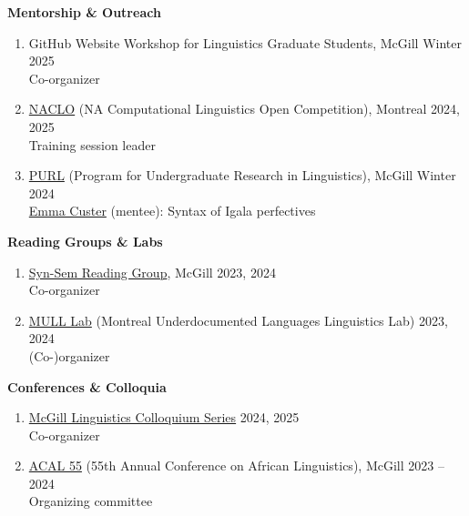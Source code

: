 \documentclass[margin,line]{resume}
\begin{document}
\begin{resume}

	\textbf{Mentorship \& Outreach}
	\begin{enumerate}[-, leftmargin=1em, topsep=2pt]
		\item[] GitHub Website Workshop for Linguistics Graduate Students, McGill \hfill Winter 2025\\
		\hphantom{...}Co-organizer

		\item[] \href{https://naclo.org/}{NACLO} (NA Computational Linguistics Open Competition), Montreal \hfill 2024, 2025\\
		      \hphantom{...}Training session leader

		\item[] \href{https://www.mcgill.ca/cogsci/research/cogs396}{PURL} (Program for Undergraduate Research in Linguistics), McGill \hfill Winter 2024\\
		      \hphantom{...}\href{https://www.linkedin.com/in/emma-custer-648345252}{Emma Custer} (mentee): Syntax of Igala perfectives
	\end{enumerate}

	\textbf{Reading Groups \& Labs}
	\begin{enumerate}[-, leftmargin=1em, topsep=2pt]
		\item[] \href{https://mcling.blogs.mcgill.ca/category/syntax-semantics-group/}{Syn-Sem Reading Group}, McGill \hfill 2023, 2024\\
		\hphantom{...}Co-organizer

		\item[] \href{https://mcling.blogs.mcgill.ca/category/mull-lab/}{MULL Lab} (Montreal Underdocumented Languages Linguistics Lab) \hfill 2023, 2024\\
		      \hphantom{...}(Co-)organizer
	\end{enumerate}

	\textbf{Conferences \& Colloquia}
	\begin{enumerate}[-, leftmargin=1em, topsep=2pt]
		\item[] \href{https://www.mcgill.ca/linguistics/events/colloquium-series}{McGill Linguistics Colloquium Series} \hfill 2024, 2025\\
		      \hphantom{...}Co-organizer

		\item[] \href{https://acal55.mull-lab.org/}{ACAL 55} (55th Annual Conference on African Linguistics), McGill \hfill 2023 -- 2024\\
		      \hphantom{...}Organizing committee
	\end{enumerate}


\end{resume}
\end{document}
